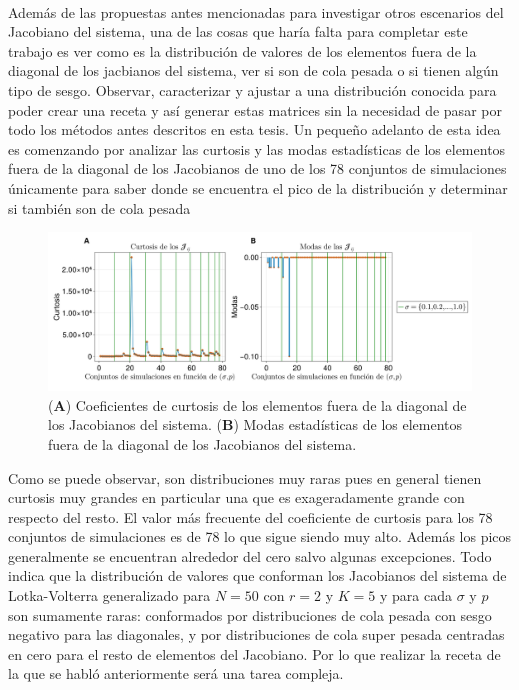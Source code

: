 \\
Además de las propuestas antes mencionadas para investigar otros escenarios del Jacobiano del sistema, una de las cosas que haría falta para completar este trabajo es ver como es la distribución de valores de los elementos fuera de la diagonal de los jacbianos del sistema, ver si son de cola pesada o si tienen algún tipo de sesgo. Observar, caracterizar y ajustar a una distribución conocida para poder crear una receta y así generar estas matrices sin la necesidad de pasar por todo los métodos antes descritos en esta tesis. Un pequeño adelanto de esta idea es comenzando por analizar las curtosis y las modas estadísticas de los elementos fuera de la diagonal de los Jacobianos de uno  de los 78 conjuntos de simulaciones únicamente para saber donde se encuentra el pico de la distribución y determinar si también son de cola pesada
\begin{figure}[h!]
	\centering
	\includegraphics[scale=0.16]{../Imagenes/CurModasJij}
	\caption{(\textbf{A}) Coeficientes de curtosis de los elementos fuera de la diagonal de los Jacobianos del sistema. (\textbf{B}) Modas estadísticas de los elementos fuera de la diagonal de los Jacobianos del sistema.}
	\label{fig:CurModasJij}
\end{figure}

Como se puede observar, son distribuciones muy raras pues en general tienen curtosis muy grandes en particular una que es exageradamente grande con respecto del resto. El valor más frecuente del coeficiente de curtosis para los 78 conjuntos de simulaciones es de 78 lo que sigue siendo muy alto. Además los picos generalmente se encuentran alrededor del cero salvo algunas excepciones. Todo indica que la distribución de valores que conforman los Jacobianos del sistema de Lotka-Volterra generalizado para $N=50$ con $r=2$ y $K=5$ y para cada $\sigma$ y $p$ son sumamente raras: conformados por distribuciones de cola pesada con sesgo negativo para las diagonales, y por distribuciones de cola super pesada centradas en cero para el resto de elementos del Jacobiano. Por lo que realizar la receta de la que se habló anteriormente será una tarea compleja.
\newpage
